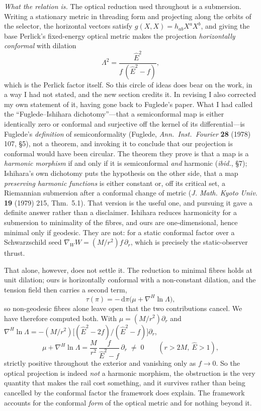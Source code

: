 \documentclass[11pt]{article}
\begin{document}
\emph{What the relation is.} The optical reduction used throughout is a
submersion. Writing a stationary metric in threading form and projecting along the
orbits of the selector, the horizontal vectors satisfy $g(X,X)=h_{ab}X^aX^b$, and
giving the base Perlick's fixed-energy optical metric makes the projection
\emph{horizontally conformal} with dilation
\[
   \Lambda^2=\frac{\hat E^2}{f\,(\hat E^2-f)} ,
\]
which is the Perlick factor itself. So this circle of ideas does bear on the work,
in a way I had not stated, and the new section credits it. In revising I also
corrected my own statement of it, having gone back to Fuglede's paper. What I had
called the ``Fuglede--Ishihara dichotomy''---that a semiconformal map is either
identically zero or conformal and surjective off the kernel of its
differential---is Fuglede's \emph{definition} of semiconformality
(Fuglede, \emph{Ann.\ Inst.\ Fourier} \textbf{28} (1978) 107, \S5), not a theorem, and invoking it to conclude that our
projection is conformal would have been circular. The theorem they prove is that a
map is a \emph{harmonic morphism} if and only if it is semiconformal \emph{and}
harmonic (\emph{ibid.}, \S7); Ishihara's own dichotomy puts the hypothesis on the
other side, that a map \emph{preserving harmonic functions} is either constant or,
off its critical set, a Riemannian submersion after a conformal change of metric
(\emph{J. Math. Kyoto Univ.} \textbf{19} (1979) 215, Thm.~5.1). That version is the
useful one, and pursuing it gave a definite answer rather than a disclaimer.
Ishihara reduces harmonicity for a submersion to minimality of the fibres, and ours
are one-dimensional, hence minimal only if geodesic. They are not: for a static
conformal factor over a Schwarzschild seed $\nabla_WW=(M/r^2)f\,\partial_r$, which
is precisely the static-observer thrust.

That alone, however, does not settle it. The
reduction to minimal fibres holds at unit dilation; ours is horizontally conformal
with a non-constant dilation, and the tension field then carries a second term,
\[
   \tau(\pi)=-\,\mathrm d\pi\big(\mu+\nabla^H\ln\Lambda\big),
\]
so non-geodesic fibres alone leave open that the two contributions cancel. We have
therefore computed both. With $\mu=(M/r^2)\partial_r$ and
$\nabla^H\ln\Lambda=-(M/r^2)\big[(\hat E^2-2f)/(\hat E^2-f)\big]\partial_r$,
\[
   \mu+\nabla^H\ln\Lambda=\frac{M}{r^2}\,\frac{f}{\hat E^2-f}\,\partial_r\;\neq\;0
   \qquad(r>2M,\ \hat E>1),
\]
strictly positive throughout the exterior and vanishing only as $f\to0$. So the
optical projection is indeed \emph{not} a harmonic morphism, the obstruction is the
very quantity that makes the rail cost something, and it survives rather than being
cancelled by the conformal factor the framework does explain. The framework accounts
for the conformal \emph{form} of the optical metric and for nothing beyond it.
\end{document}
